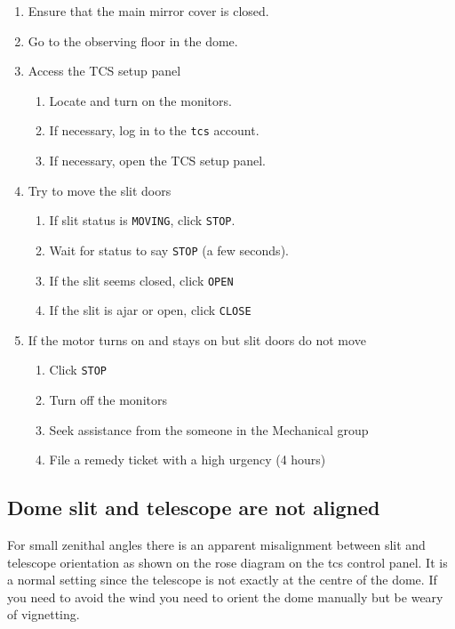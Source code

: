 \documentclass[11pt,fleqn,a4paper]{book}
\begin{document}
\begin{enumerate}
    \item Ensure that the main mirror cover is closed.
    \item Go to the observing floor in the \gls{dome}.
    \item Access the \gls{TCS setup panel}
        \begin{enumerate}
            \item Locate and turn on the monitors.
            \item If necessary, log in to the \texttt{tcs} account.
            \item If necessary, open the \gls{TCS setup panel}.
        \end{enumerate}
    \item Try to move the slit doors
        \begin{enumerate}
            \item If slit status is \texttt{MOVING}, click \texttt{STOP}.
            \item Wait for status to say \texttt{STOP} (a few seconds).
            \item If the slit seems closed, click \texttt{OPEN}
            \item If the slit is ajar or open, click \texttt{CLOSE}
        \end{enumerate}
    \item If the motor turns on and stays on but slit doors do not move
        \begin{enumerate}
            \item Click \texttt{STOP}
            \item Turn off the monitors
            \item Seek assistance from the someone in the Mechanical group
            \item File a remedy ticket with a high urgency (4 hours)
        \end{enumerate}
\end{enumerate}

\subsection{Dome slit and telescope are not aligned}
For small zenithal angles there is an apparent misalignment between \gls{slit} and telescope orientation as shown on the \gls{rose diagram} on the \gls{tcs} control panel. It is a normal setting since the telescope is not exactly at the centre of the \gls{dome}.  If you need to avoid the wind you need to orient the \gls{dome} manually but be weary of vignetting.
\end{document}
